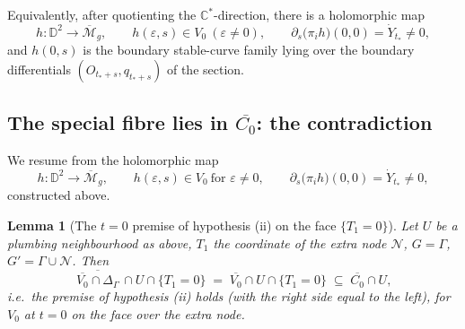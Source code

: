 \documentclass[11pt]{article}
\newcommand{\C}{\mathbb{C}}
\newcommand{\D}{\mathbb{D}}
\newcommand{\M}{\mathcal{M}}
\newtheorem{lem}[thm]{Lemma}
\theoremstyle{definition}
\theoremstyle{remark}
\begin{document}
Equivalently, after quotienting the $\C^*$-direction, there is a
holomorphic map
\[
h : \D^2 \longrightarrow \overline{\M}_g, \qquad h(\varepsilon, s) \in
V_0 \ (\varepsilon \neq 0), \qquad \partial_s\bigl(\pi_i h\bigr)(0,0)
= \dot Y_{t_*} \neq 0,
\]
and $h(0,s)$ is the boundary stable-curve family lying over the
boundary differentials $(O_{t_*+s},q_{t_*+s})$ of the section.

\subsection{The special fibre lies in $\overline{C_0}$: the contradiction}

We resume from the holomorphic map
\[
h : \D^2 \longrightarrow \overline{\M}_g, \qquad h(\varepsilon, s) \in
V_0 \ \text{for } \varepsilon \neq 0, \qquad
\partial_s\bigl(\pi_i h\bigr)(0,0) = \dot Y_{t_*} \neq 0,
\]
constructed above.

\begin{lem}[The $t = 0$ premise of hypothesis (ii) on the face
$\{T_1 = 0\}$]\label{lem:premise}
Let $U$ be a plumbing neighbourhood as above, $T_1$ the coordinate of
the extra node $\mathcal N$, $G = \Gamma$, $G' = \Gamma \cup
\mathcal N$. Then
\[
\overline{\,\overline{V_0} \cap \Delta_\Gamma\,} \cap U \cap \{T_1 = 0\}
\;=\; \overline{V_0} \cap U \cap \{T_1 = 0\}
\;\subseteq\; \overline{C_0} \cap U,
\]
i.e.\ the premise of hypothesis (ii) holds (with the right side equal to
the left), for $V_0$ at $t = 0$ on the face over the extra node.
\end{lem}
\end{document}
